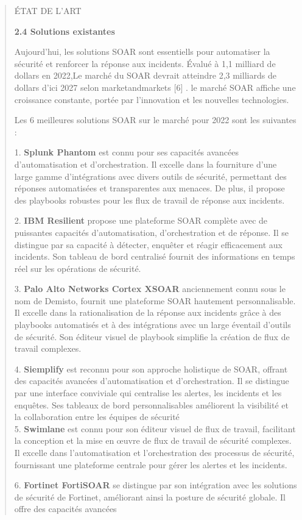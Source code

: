 \documentclass[
]{article}
\begin{document}
\begin{quote}
ÉTAT DE L'ART

\textbf{2.4 Solutions existantes}

Aujourd'hui, les solutions SOAR sont essentiells pour automatiser la
sécurité et renforcer la réponse aux incidents. Évalué à 1,1 milliard de
dollars en 2022,Le marché du SOAR devrait atteindre 2,3 milliards de
dollars d'ici 2027 selon marketandmarkets {[}6{]} . le marché SOAR
affiche une croissance constante, portée par l'innovation et les
nouvelles technologies.

Les 6 meilleures solutions SOAR sur le marché pour 2022 sont les
suivantes :

1. \textbf{Splunk Phantom} est connu pour ses capacités avancées
d'automatisation et d'orchestration. Il excelle dans la fourniture d'une
large gamme d'intégrations avec divers outils de sécurité, permettant
des réponses automatisées et transparentes aux menaces. De plus, il
propose des playbooks robustes pour les flux de travail de réponse aux
incidents.

2. \textbf{IBM Resilient} propose une plateforme SOAR complète avec de
puissantes capacités d'automatisation, d'orchestration et de réponse. Il
se distingue par sa capacité à détecter, enquêter et réagir efficacement
aux incidents. Son tableau de bord centralisé fournit des informations
en temps réel sur les opérations de sécurité.

3. \textbf{Palo Alto Networks Cortex XSOAR} anciennement connu sous le
nom de Demisto, fournit une plateforme SOAR hautement personnalisable.
Il excelle dans la rationalisation de la réponse aux incidents grâce à
des playbooks automatisés et à des intégrations avec un large éventail
d'outils de sécurité. Son éditeur visuel de playbook simplifie la
création de flux de travail complexes.

4. \textbf{Siemplify} est reconnu pour son approche holistique de SOAR,
offrant des capacités avancées d'automatisation et d'orchestration. Il
se distingue par une interface conviviale qui centralise les alertes,
les incidents et les enquêtes. Ses tableaux de bord personnalisables
améliorent la visibilité et la collaboration entre les équipes de
sécurité\\
5. \textbf{Swimlane} est connu pour son éditeur visuel de flux de
travail, facilitant la conception et la mise en œuvre de flux de travail
de sécurité complexes. Il excelle dans l'automatisation et
l'orchestration des processus de sécurité, fournissant une plateforme
centrale pour gérer les alertes et les incidents.

6. \textbf{Fortinet FortiSOAR} se distingue par son intégration avec les
solutions de sécurité de Fortinet, améliorant ainsi la posture de
sécurité globale. Il offre des capacités avancées
\end{quote}
\end{document}
